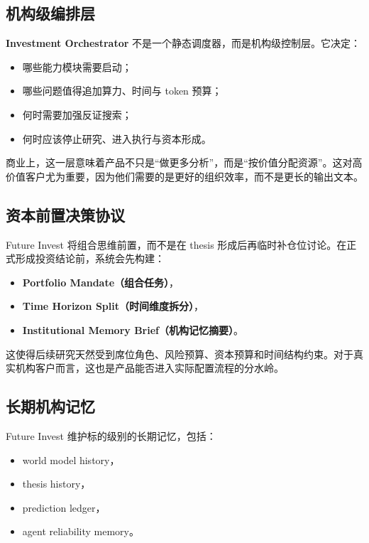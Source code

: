 \documentclass[11pt]{article}
\begin{document}
\subsection{机构级编排层}

\textbf{Investment Orchestrator} 不是一个静态调度器，而是机构级控制层。它决定：

\begin{itemize}
\item 哪些能力模块需要启动；
\item 哪些问题值得追加算力、时间与 token 预算；
\item 何时需要加强反证搜索；
\item 何时应该停止研究、进入执行与资本形成。
\end{itemize}

商业上，这一层意味着产品不只是“做更多分析”，而是“按价值分配资源”。这对高价值客户尤为重要，因为他们需要的是更好的组织效率，而不是更长的输出文本。

\subsection{资本前置决策协议}

Future Invest 将组合思维前置，而不是在 thesis 形成后再临时补仓位讨论。在正式形成投资结论前，系统会先构建：

\begin{itemize}
\item \textbf{Portfolio Mandate（组合任务）}，
\item \textbf{Time Horizon Split（时间维度拆分）}，
\item \textbf{Institutional Memory Brief（机构记忆摘要）}。
\end{itemize}

这使得后续研究天然受到席位角色、风险预算、资本预算和时间结构约束。对于真实机构客户而言，这也是产品能否进入实际配置流程的分水岭。

\subsection{长期机构记忆}

Future Invest 维护标的级别的长期记忆，包括：

\begin{itemize}
\item world model history，
\item thesis history，
\item prediction ledger，
\item agent reliability memory。
\end{itemize}
\end{document}
